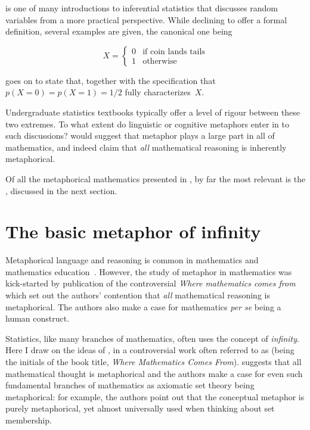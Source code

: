 \citeauthor{2015} is one of many introductions to inferential
statistics that discusses random variables from a more practical
perspective.  While declining to offer a formal definition, several
examples are given, the canonical one being

\[
X = \begin{cases}
  0 &\text{if coin lands tails}\\
  1 &\text{otherwise}
\end{cases}
\]

\noindent\citeauthor{crawley2015} goes on to state that, together with
the specification that~$p(X=0) = p(X=1)=1/2$ fully characterizes~$X$.

Undergraduate statistics textbooks typically offer a level of rigour
between these two extremes.  To what extent do linguistic or cognitive
metaphors enter in to such discussions?   would
suggest that metaphor plays a large part in all of mathematics, and
indeed claim that \emph{all} mathematical reasoning is inherently
metaphorical.

Of all the metaphorical mathematics presented in \wmcf, by far the
most relevant is the , discussed
in the next section.

\section{The basic metaphor of infinity}


Metaphorical language and reasoning is common in mathematics and
mathematics education~\parencite{pimm_metaphor_1981}.  However, the
study of metaphor in mathematics was kick-started by publication of
the controversial {\em Where mathematics comes
  from}~\parencite{lakoff2000} which set out the authors' contention
that {\em all} mathematical reasoning is metaphorical.  The authors
also make a case for mathematics {\em per se} being a human construct.

Statistics, like many branches of mathematics, often uses the concept
of \emph{infinity}.  Here I draw on the ideas of ,
in a controversial work often referred to as \dquote{\wmcf} (being the
initials of the book title, \emph{Where Mathematics Comes From}).
\wmcf suggests that all mathematical thought is metaphorical and the
authors make a case for even such fundamental branches of mathematics
as axiomatic set theory being metaphorical: for example, the authors
point out that the conceptual metaphor  is purely metaphorical, yet almost
universally used when thinking about set membership.

